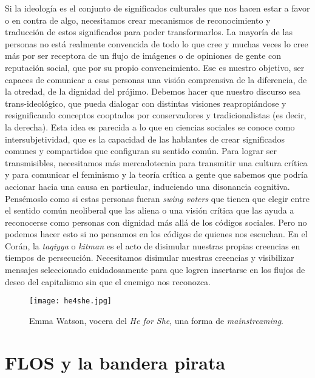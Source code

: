 Si la ideología es el conjunto de significados culturales que nos hacen estar a favor o en contra de algo, necesitamos crear mecanismos de reconocimiento y traducción de estos significados para poder transformarlos. La mayoría de las personas no está realmente convencida de todo lo que cree y muchas veces lo cree más por ser receptora de un flujo de imágenes o de opiniones de gente con reputación social, que por su propio convencimiento. Ese es nuestro objetivo, ser capaces de comunicar a esas personas una visión comprensiva de la diferencia, de la otredad, de la dignidad del prójimo. Debemos hacer que nuestro discurso sea trans-ideológico, que pueda dialogar con distintas visiones reapropiándose y resignificando conceptos cooptados por conservadores y tradicionalistas (es decir, la derecha). Esta idea es parecida a lo que en ciencias sociales se conoce como intersubjetividad, que es la capacidad de las hablantes de crear significados comunes y compartidos que configuran su sentido común. Para lograr ser transmisibles, necesitamos más mercadotecnia para transmitir una cultura crítica y para comunicar el feminismo y la teoría crítica a gente que sabemos que podría accionar hacia una causa en particular, induciendo una disonancia cognitiva. Pensémoslo como si estas personas fueran \emph{swing voters} que tienen que elegir entre el sentido común neoliberal que las aliena o una visión crítica que las ayuda a reconocerse como personas con dignidad más allá de los códigos sociales. Pero no podemos hacer esto si no pensamos en los códigos de quienes nos escuchan. En el Corán, la \emph{taqiyya} o \emph{kitman} es el acto de disimular nuestras propias creencias en tiempos de persecución. Necesitamos disimular nuestras creencias y visibilizar mensajes seleccionado cuidadosamente para que logren insertarse en los flujos de deseo del capitalismo sin que el enemigo nos reconozca.

\begin{figure}[htbp]
	\centering
	\texttt{[image: he4she.jpg]}
	\caption[Emma Watson, vocera del \emph{He for She}.]{Emma Watson, vocera del \emph{He for She}, una forma de \emph{mainstreaming}.}
	\label{fig:he4she}
\end{figure}

\section{FLOS y la bandera pirata}
\label{sec:FLOS}

